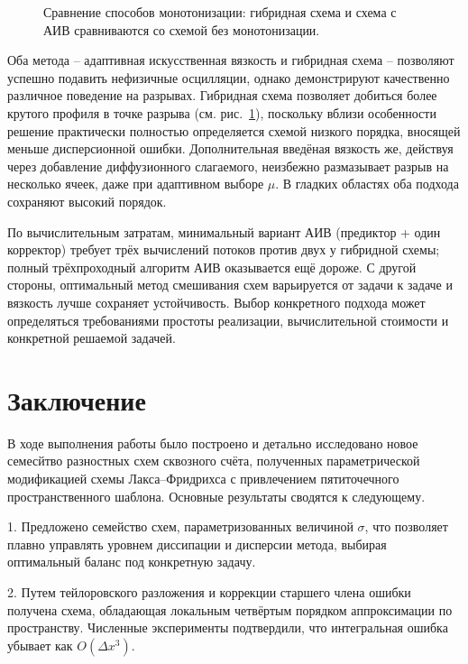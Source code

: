 \documentclass[14pt]{report}
\begin{document}
\begin{figure}[ht]
    \centering
    
    \caption{Сравнение способов монотонизации: гибридная схема и схема с АИВ сравниваются со схемой без монотонизации.}
    \label{fig:hybrid}
\end{figure}

Оба метода -- адаптивная искусственная вязкость и гибридная схема -- позволяют успешно подавить нефизичные осцилляции, однако демонстрируют качественно различное поведение на разрывах. Гибридная схема позволяет добиться более крутого профиля в точке разрыва (см. рис.~\ref{fig:hybrid}), поскольку вблизи особенности решение практически полностью определяется схемой низкого порядка, вносящей меньше дисперсионной ошибки. Дополнительная введёная вязкость же, действуя через добавление диффузионного слагаемого, неизбежно размазывает разрыв на несколько ячеек, даже при адаптивном выборе $\mu$. В гладких областях оба подхода сохраняют высокий порядок.

По вычислительным затратам, минимальный вариант АИВ (предиктор + один корректор) требует трёх вычислений потоков против двух у гибридной схемы; полный трёхпроходный алгоритм АИВ оказывается ещё дороже. С другой стороны, оптимальный метод смешивания схем варьируется от задачи к задаче и вязкость лучше сохраняет устойчивость. Выбор конкретного подхода может определяться требованиями простоты реализации, вычислительной стоимости и конкретной решаемой задачей.

\chapter{Заключение}
\label{sec:conclusion}

В ходе выполнения работы было построено и детально исследовано новое семесйтво разностных схем сквозного счёта, полученных параметрической модификацией схемы Лакса--Фридрихса с привлечением пятиточечного пространственного шаблона. Основные результаты сводятся к следующему.

1. Предложено семейство схем, параметризованных величиной $\sigma$, что позволяет плавно управлять уровнем диссипации и дисперсии метода, выбирая оптимальный баланс под конкретную задачу.

2. Путем тейлоровского разложения и коррекции старшего члена ошибки получена схема, обладающая локальным четвёртым порядком аппроксимации по пространству. Численные эксперименты подтвердили, что интегральная ошибка убывает как $O(\Delta x^3)$.
\end{document}
